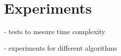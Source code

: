 
\chapter{Experiments}
\label{cap:experiments}

- tests to mesure time complexity

- experiments for different algorithms